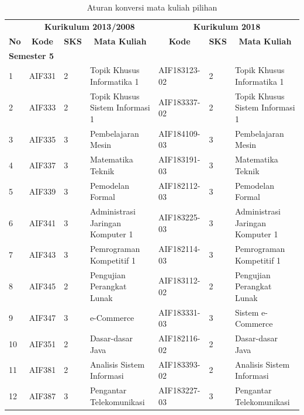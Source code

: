 \begin{table}[H]
\centering
\caption{Aturan konversi mata kuliah pilihan}
\label{tab:aturankonversipilihan}
\begin{tabular}{|p{0.35cm}|p{2cm}|p{0.55cm}|p{3.45cm}|p{2.65cm}|p{0.55cm}|p{3.45cm}|}
\hline
\multicolumn{1}{|c|}{} & \multicolumn{3}{c|}{\textbf{Kurikulum 2013/2008}} & \multicolumn{3}{c|}{\textbf{Kurikulum 2018}} \\ \cline{2-7} 
\multicolumn{1}{|c|}{\multirow{-2}{*}{\textbf{No}}} & \multicolumn{1}{c|}{\textbf{Kode}} & \multicolumn{1}{c|}{\textbf{SKS}} & \multicolumn{1}{c|}{\textbf{Mata Kuliah}} & \multicolumn{1}{c|}{\textbf{Kode}} & \multicolumn{1}{c|}{\textbf{SKS}} & \multicolumn{1}{c|}{\textbf{Mata Kuliah}} \\ \hline
\multicolumn{7}{|l|}{\textbf{Semester 5}} \\ \hline
1  & AIF331 & 2 & Topik Khusus Informatika 1       & AIF183123-02 & 2 & Topik Khusus Informatika 1       \\ \hline
2  & AIF333 &  2 & Topik Khusus Sistem Informasi 1  & AIF183337-02 & 2 & Topik Khusus Sistem Informasi 1  \\ \hline
3  & AIF335 &  3 & Pembelajaran Mesin               & AIF184109-03 & 3 & Pembelajaran Mesin               \\ \hline
4  & AIF337 &  3 & Matematika Teknik                & AIF183191-03 & 3 & Matematika Teknik                \\ \hline
5  & AIF339 & 3 & Pemodelan Formal                 & AIF182112-03 & 3 & Pemodelan Formal                 \\ \hline
6  & AIF341 & 3 & Administrasi Jaringan Komputer 1 & AIF183225-03 & 3 & Administrasi Jaringan Komputer 1 \\ \hline
7  & AIF343 & 3 & Pemrograman Kompetitif 1         & AIF182114-03 & 3 & Pemrograman Kompetitif 1         \\ \hline
8  & AIF345 & 2 & Pengujian Perangkat Lunak        & AIF183112-02 & 2 & Pengujian Perangkat Lunak        \\ \hline
9  & AIF347 & 3 & e-Commerce                       & AIF183331-03 & 3 & Sistem e-Commerce                \\ \hline
10 & AIF351 & 2 & Dasar-dasar Java                 & AIF182116-02 & 2 & Dasar-dasar Java                 \\ \hline
11 & AIF381 & 2 & Analisis Sistem Informasi        & AIF183393-02 & 2 & Analisis Sistem Informasi        \\ \hline
12 & AIF387 & 3 & Pengantar Telekomunikasi         & AIF183227-03 & 3 & Pengantar Telekomunikasi         \\ \hline

\end{tabular}
\end{table}
